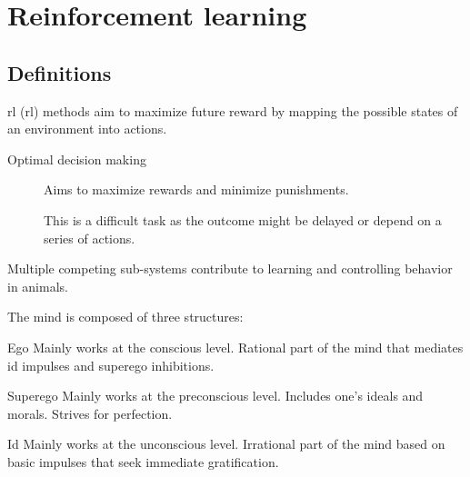 \chapter{Reinforcement learning}


\section{Definitions}

\Acl{rl} (\acs{rl}) methods aim to maximize future reward by mapping the possible states of an environment into actions.

\begin{description}
    \item[Optimal decision making] 
        Aims to maximize rewards and minimize punishments.

        \begin{remark}
            This is a difficult task as the outcome might be delayed or depend on a series of actions.
            
        \end{remark}
\end{description}

\begin{remark}
    Multiple competing sub-systems contribute to learning and controlling behavior in animals.

    \begin{example}
        The mind is composed of three structures:
        \begin{descriptionlist}
            \item[Ego]
                Mainly works at the conscious level.
                Rational part of the mind that mediates id impulses and superego inhibitions.

            \item[Superego] 
                Mainly works at the preconscious level.
                Includes one's ideals and morals. Strives for perfection.

            \item[Id] 
                Mainly works at the unconscious level.
                Irrational part of the mind based on basic impulses that seek immediate gratification.
        \end{descriptionlist}
    \end{example}
\end{remark}


